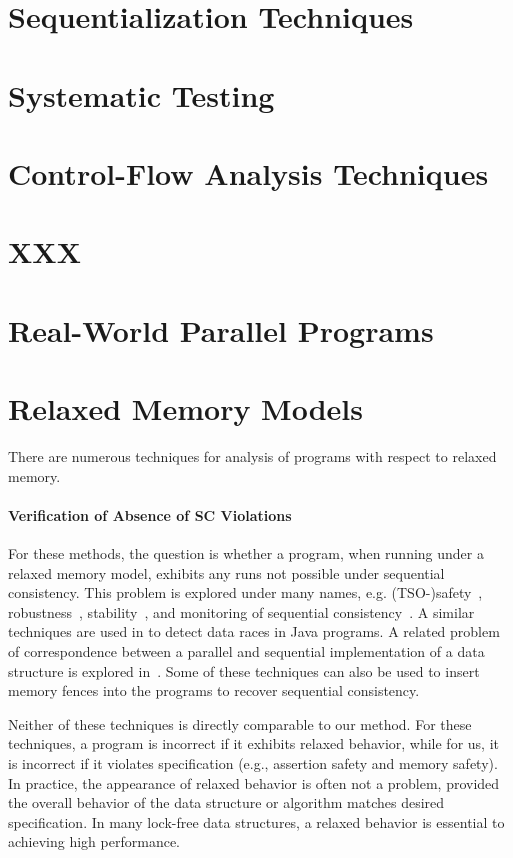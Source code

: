 \section{Sequentialization Techniques}

\section{Systematic Testing}

\section{Control-Flow Analysis Techniques}

\section{XXX}

\section{Real-World Parallel Programs}


\section{Relaxed Memory Models}

There are numerous techniques for analysis of programs with respect to relaxed memory.

\paragraph{Verification of Absence of SC Violations}

For these methods, the question is whether a program, when running under a relaxed memory model, exhibits any runs not possible under sequential consistency.
This problem is explored under many names, e.g. (TSO-)safety~\cite{Burckhardt2008}, robustness~\cite{Bouajjani2013,Derevenetc2014}, stability~\cite{Alglave2011}, and monitoring of sequential consistency~\cite{Burnim2011}.
A similar techniques are used in \cite{Yang2004} to detect data races in Java programs.
A related problem of correspondence between a parallel and sequential implementation of a data structure is explored in~\cite{Ou2017}.
Some of these techniques can also be used to insert memory fences into the programs to recover sequential consistency.

Neither of these techniques is directly comparable to our method.
For these techniques, a program is incorrect if it exhibits relaxed behavior, while for us, it is incorrect if it violates specification (e.g., assertion safety and memory safety).
In practice, the appearance of relaxed behavior is often not a problem, provided the overall behavior of the data structure or algorithm matches desired specification.
In many lock-free data structures, a relaxed behavior is essential to achieving high performance.

